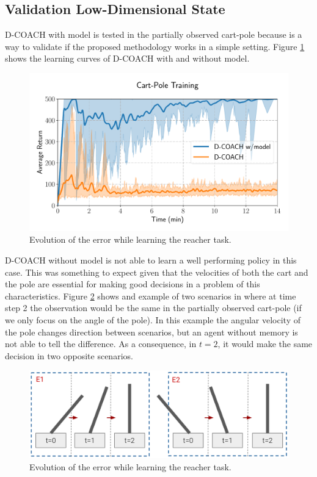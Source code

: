 \subsection{Validation Low-Dimensional State}

D-COACH with model is tested in the partially observed cart-pole because is a way to validate if the proposed methodology works in a simple setting. Figure \ref{fig:ld_cartpole_model} shows the learning curves of D-COACH with and without model. 

\begin{figure}[h]
    \centering
    \includegraphics[width=0.9\linewidth]{imagenes/cap3/cartpole_LD_model.pdf}
    \caption{Evolution of the error while learning the reacher task. }
    \label{fig:ld_cartpole_model}
\end{figure}

D-COACH without model is not able to learn a well performing policy in this case. This was something to expect given that the velocities of both the cart and the pole are essential for making good decisions in a problem of this characteristics. Figure \ref{fig:cp_ex} shows and example of two scenarios in where at time step 2 the observation would be the same in the partially observed cart-pole (if we only focus on the angle of the pole). In this example the angular velocity of the pole changes direction between scenarios, but an agent without memory is not able to tell the difference. As a consequence, in $t=2$, it would make the same decision in two opposite scenarios.

\begin{figure}[h]
    \centering
    \includegraphics[width=0.9\linewidth]{imagenes/cap4/cartpole_ex.png}
    \caption{Evolution of the error while learning the reacher task. }
    \label{fig:cp_ex}
\end{figure}

